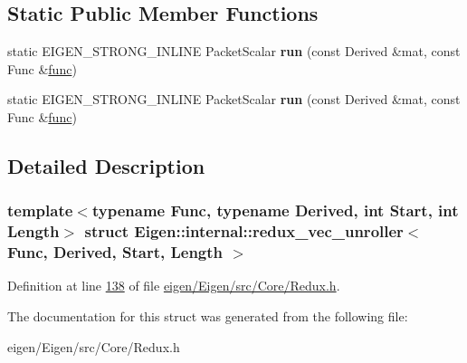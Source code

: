\subsection*{Static Public Member Functions}
\begin{DoxyCompactItemize}
\item 
\mbox{\label{struct_eigen_1_1internal_1_1redux__vec__unroller_aa41cff18de625592df82c377cd67d916}} 
static E\+I\+G\+E\+N\+\_\+\+S\+T\+R\+O\+N\+G\+\_\+\+I\+N\+L\+I\+NE Packet\+Scalar {\bfseries run} (const Derived \&mat, const Func \&\hyperlink{structfunc}{func})
\item 
\mbox{\label{struct_eigen_1_1internal_1_1redux__vec__unroller_aa41cff18de625592df82c377cd67d916}} 
static E\+I\+G\+E\+N\+\_\+\+S\+T\+R\+O\+N\+G\+\_\+\+I\+N\+L\+I\+NE Packet\+Scalar {\bfseries run} (const Derived \&mat, const Func \&\hyperlink{structfunc}{func})
\end{DoxyCompactItemize}


\subsection{Detailed Description}
\subsubsection*{template$<$typename Func, typename Derived, int Start, int Length$>$\newline
struct Eigen\+::internal\+::redux\+\_\+vec\+\_\+unroller$<$ Func, Derived, Start, Length $>$}



Definition at line \hyperlink{eigen_2_eigen_2src_2_core_2_redux_8h_source_l00138}{138} of file \hyperlink{eigen_2_eigen_2src_2_core_2_redux_8h_source}{eigen/\+Eigen/src/\+Core/\+Redux.\+h}.



The documentation for this struct was generated from the following file\+:\begin{DoxyCompactItemize}
\item 
eigen/\+Eigen/src/\+Core/\+Redux.\+h\end{DoxyCompactItemize}
